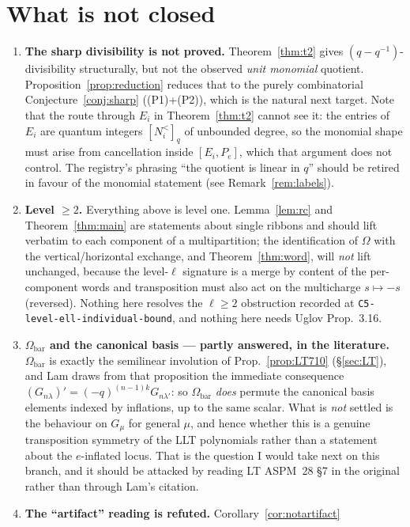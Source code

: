 \documentclass[11pt]{article}
\theoremstyle{plain}
\theoremstyle{definition}
\newcommand{\Om}{\Omega}
\newcommand{\Ombar}{\Om_{\mathrm{bar}}}
\newcommand{\qq}{(q-q^{-1})}
\begin{document}
\section{What is not closed}
\label{sec:open}

\begin{enumerate}
\item \textbf{The sharp divisibility is not proved.}
Theorem~\ref{thm:t2} gives $\qq$-divisibility structurally, but not the
observed \emph{unit monomial} quotient.  Proposition~\ref{prop:reduction}
reduces that to the purely combinatorial Conjecture~\ref{conj:sharp}
((P1)+(P2)), which is the natural next target.  Note that the route through
$E_i$ in Theorem~\ref{thm:t2} cannot see it: the entries of $E_i$ are quantum
integers $[N^{<}_i]_q$ of unbounded degree, so the monomial shape must arise
from cancellation inside $[E_i,P_e]$, which that argument does not control.
The registry's phrasing ``the quotient is linear in $q$'' should be retired in
favour of the monomial statement (see Remark~\ref{rem:labels}).
\item \textbf{Level $\ge2$.}  Everything above is level one.
Lemma~\ref{lem:rc} and Theorem~\ref{thm:main} are statements about single
ribbons and should lift verbatim to each component of a multipartition; the
identification of $\Om$ with the vertical/horizontal exchange, and
Theorem~\ref{thm:word}, will \emph{not} lift unchanged, because the level-$\ell$
signature is a merge by content of the per-component words and transposition
must also act on the multicharge $s\mapsto-s$ (reversed).  Nothing here
resolves the $\ell\ge2$ obstruction recorded at
\texttt{C5-level-ell-individual-bound}, and nothing here needs Uglov Prop.~3.16.
\item \textbf{$\Ombar$ and the canonical basis --- partly answered, in the
literature.}  $\Ombar$ is exactly the semilinear involution of
Prop.~\ref{prop:LT710} (\S\ref{sec:LT}), and Lam draws from that proposition
the immediate consequence $(G_{n\lambda})'=(-q)^{(n-1)k}G_{n\lambda'}$: so
$\Ombar$ \emph{does} permute the canonical basis elements indexed by
inflations, up to the same scalar.  What is \emph{not} settled is the
behaviour on $G_\mu$ for general $\mu$, and hence whether this is a genuine
transposition symmetry of the LLT polynomials rather than a statement about
the $e$-inflated locus.  That is the question I would take next on this
branch, and it should be attacked by reading LT ASPM~28 \S7 in the original
rather than through Lam's citation.
\item \textbf{The ``artifact'' reading is refuted.}  Corollary~\ref{cor:notartifact}

\end{enumerate}
\end{document}

